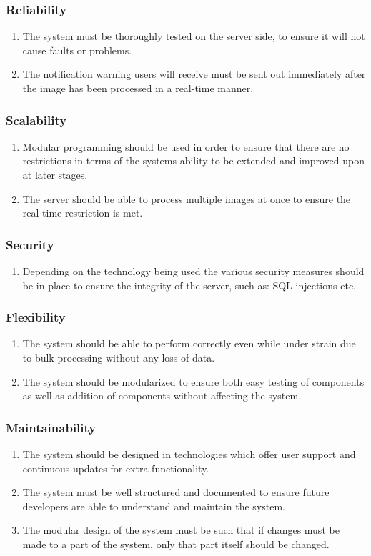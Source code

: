 \documentclass[a4paper,12pt]{report}
\begin{document}
\subsubsection{Reliability}
\begin{enumerate}
	\item The system must be thoroughly tested on the server side, to
	ensure it will not cause faults or problems. 
	\item The notification warning users will receive must be sent out immediately after the image has been processed in a real-time manner.
\end{enumerate}
\subsubsection{Scalability}
\begin{enumerate}
	\item Modular programming should be used in order to ensure that there are no restrictions in terms of the systems ability to be extended and improved upon at later stages.
	\item The server should be able to process multiple images at once to ensure the real-time restriction is met.
\end{enumerate}
\subsubsection{Security}
\begin{enumerate}
	\item Depending on the technology being used the various security measures should be in place to ensure the integrity of the server, such as: SQL injections etc.
\end{enumerate}
\subsubsection{Flexibility}
\begin{enumerate}
	\item The system should be able to perform correctly even while under strain due to bulk processing without any loss of data.
	\item The system should be modularized to ensure both easy testing of components as well as addition of components without affecting the system.
\end{enumerate}
\subsubsection{Maintainability}
\begin{enumerate}
	\item The system should be designed in technologies which offer user support and continuous updates for extra functionality.
	\item The system must be well structured and documented to ensure future developers are able to understand and maintain the system.
	\item The modular design of the system must be such that if changes must be made to a part of the system, only that part itself should be changed.
\end{enumerate}
\end{document}
